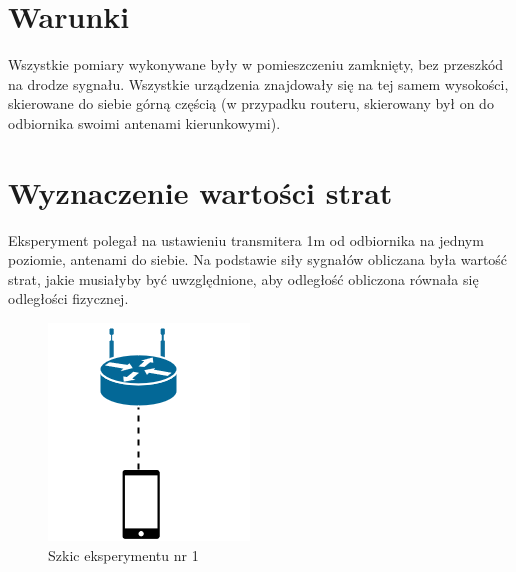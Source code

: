 \section{Warunki}
Wszystkie pomiary wykonywane były w pomieszczeniu zamknięty, bez przeszkód na drodze sygnału. Wszystkie urządzenia znajdowały się na tej samem wysokości, skierowane do siebie górną częścią (w przypadku routeru, skierowany był on do odbiornika swoimi antenami kierunkowymi).
\section{Wyznaczenie wartości strat}
Eksperyment polegał na ustawieniu transmitera 1m od odbiornika na jednym poziomie, antenami do siebie. Na podstawie siły sygnałów obliczana była wartość strat, jakie musiałyby być uwzględnione, aby odległość obliczona równała się odległości fizycznej.\\			
\begin{figure}[H]
	\centering			
	\caption{Szkic eksperymentu nr 1}
	\includegraphics{exper1}
\end{figure}
